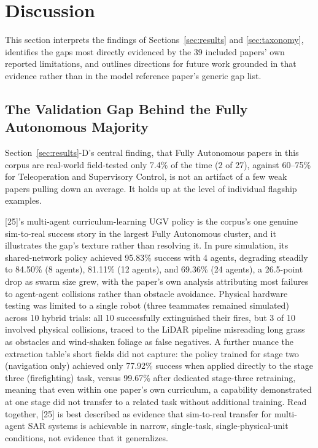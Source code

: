 \documentclass[journal]{IEEEtran}
\begin{document}
\section{Discussion}
\label{sec:discussion}
This section interprets the findings of Sections~\ref{sec:results} and \ref{sec:taxonomy}, identifies the gaps most directly evidenced by the 39 included papers' own reported limitations, and outlines directions for future work grounded in that evidence rather than in the model reference paper's generic gap list.

\subsection{The Validation Gap Behind the Fully Autonomous Majority}

Section~\ref{sec:results}-D's central finding, that Fully Autonomous papers in this corpus are real-world field-tested only 7.4\% of the time (2 of 27), against 60--75\% for Teleoperation and Supervisory Control, is not an artifact of a few weak papers pulling down an average. It holds up at the level of individual flagship examples.

[25]'s multi-agent curriculum-learning UGV policy is the corpus's one genuine sim-to-real success story in the largest Fully Autonomous cluster, and it illustrates the gap's texture rather than resolving it. In pure simulation, its shared-network policy achieved 95.83\% success with 4 agents, degrading steadily to 84.50\% (8 agents), 81.11\% (12 agents), and 69.36\% (24 agents), a 26.5-point drop as swarm size grew, with the paper's own analysis attributing most failures to agent-agent collisions rather than obstacle avoidance. Physical hardware testing was limited to a single robot (three teammates remained simulated) across 10 hybrid trials: all 10 successfully extinguished their fires, but 3 of 10 involved physical collisions, traced to the LiDAR pipeline misreading long grass as obstacles and wind-shaken foliage as false negatives. A further nuance the extraction table's short fields did not capture: the policy trained for stage two (navigation only) achieved only 77.92\% success when applied directly to the stage three (firefighting) task, versus 99.67\% after dedicated stage-three retraining, meaning that even within one paper's own curriculum, a capability demonstrated at one stage did not transfer to a related task without additional training. Read together, [25] is best described as evidence that sim-to-real transfer for multi-agent SAR systems is achievable in narrow, single-task, single-physical-unit conditions, not evidence that it generalizes.
\end{document}
